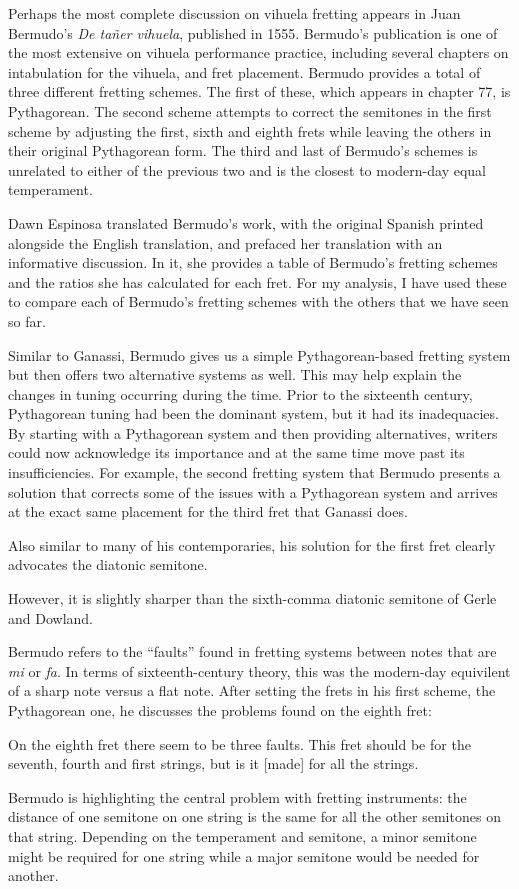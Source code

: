 Perhaps the most complete discussion on vihuela fretting appears in Juan Bermudo's
\textit{De ta\~{n}er vihuela}, published in 1555.  Bermudo's publication is one of the
most extensive on vihuela performance practice, including several chapters on
intabulation for the vihuela, and fret placement.  Bermudo provides a total of three
different fretting schemes.  The first of these, which appears in chapter 77, is
Pythagorean.  The second scheme attempts to correct the semitones in the first scheme
by adjusting the first, sixth and eighth frets while leaving the others in their
original Pythagorean form.  The third and last of Bermudo's schemes is unrelated to
either of the previous two and is the closest to modern-day equal temperament.

Dawn Espinosa translated Bermudo's work, with the original Spanish printed alongside
the English translation, and prefaced her translation with an informative discussion.
In it, she provides a table of Bermudo's fretting schemes and the ratios she has
calculated for each fret. For my analysis, I have used these to compare each of
Bermudo's fretting schemes with the others that we have seen so far.

Similar to Ganassi, Bermudo gives us a simple Pythagorean-based fretting system but
then offers two alternative systems as well. This may help explain the changes in
tuning occurring during the time.  Prior to the sixteenth century, Pythagorean tuning
had been the dominant system, but it had its inadequacies.  By starting with a
Pythagorean system and then providing alternatives, writers could now acknowledge its
importance and at the same time move past its insufficiencies.  For example, the second
fretting system that Bermudo presents a solution that corrects some of the issues with
a Pythagorean system and arrives at the exact same placement for the third fret that
Ganassi does.

Also similar to many of his contemporaries, his solution for the first fret clearly
advocates the diatonic semitone.

However, it is slightly sharper than the sixth-comma diatonic semitone of Gerle and
Dowland.

Bermudo refers to the ``faults'' found in fretting systems between notes that are
\textit{mi} or \textit{fa}.  In terms of sixteenth-century theory, this was the
modern-day equivilent of a sharp note versus a flat note.  After setting the frets in
his first scheme, the Pythagorean one, he discusses the problems found on the eighth
fret:
\begin{blocks}
On the eighth fret there seem to be three faults.  This fret should be  for the
seventh, fourth and first strings, but is it [made]  for all the strings.
\autocite[95]{DE:1}
\end{blocks}
Bermudo is highlighting the central problem with fretting instruments: the distance of one
semitone on one string is the same for all the other semitones on that string.  Depending
on the temperament and semitone, a minor semitone might be required for one string while
a major semitone would be needed for another.

